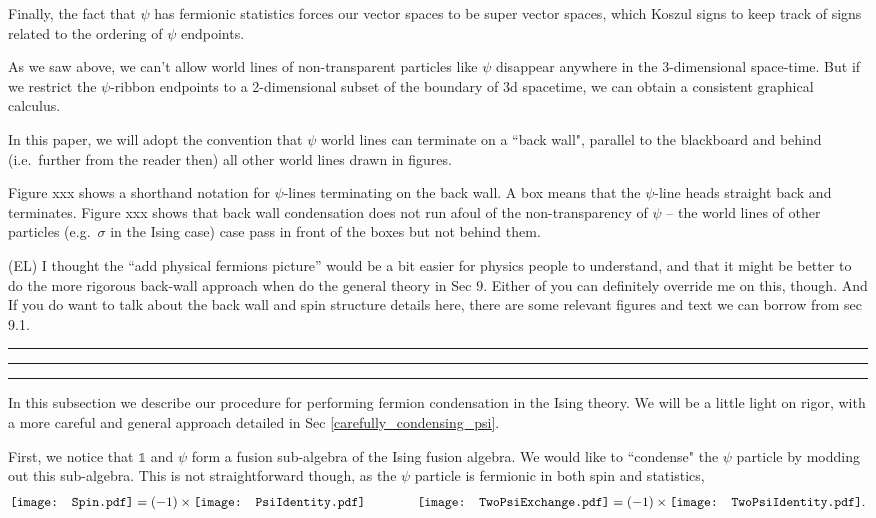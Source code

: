 \documentclass[12pt,a4paper]{article}
\newcommand{\unit}{\mathds{1}}
\newcommand{\dave}[1]{{\color{ao(english)}\footnotesize{(DA) #1}}}
\newcommand{\ethan}[1]{{\color{amethyst}\footnotesize{(EL) #1}}}
\newcommand{\kwsep}{\bigskip\hrule\medskip\hrule\medskip\hrule\bigskip}
\newcommand{\Spin}{\mathord{\vcenter{\hbox{\texttt{[image: Spin.pdf]}}}}}
\newcommand{\PsiIdentity}{\mathord{\vcenter{\hbox{\texttt{[image: PsiIdentity.pdf]}}}}}
\newcommand{\TwoPsiExchange}{\mathord{\vcenter{\hbox{\texttt{[image: TwoPsiExchange.pdf]}}}}}
\newcommand{\TwoPsiIdentity}{\mathord{\vcenter{\hbox{\texttt{[image: TwoPsiIdentity.pdf]}}}}}
\begin{document}
Finally, the fact that $\psi$ has fermionic statistics forces our vector spaces to be super vector spaces,
which Koszul signs to keep track of signs related to the ordering of $\psi$ endpoints.

\medskip

As we saw above, we can't allow world lines of non-transparent particles like $\psi$ disappear anywhere
in the 3-dimensional space-time.
But if we restrict the $\psi$-ribbon endpoints to a 2-dimensional subset of the boundary of 3d spacetime,
we can obtain a consistent graphical calculus.

In this paper, we will adopt the convention that $\psi$ world lines can terminate on a ``back wall", parallel to the 
blackboard and behind (i.e.\ further from the reader then) all other world lines drawn in figures.

Figure xxx shows a shorthand notation for $\psi$-lines terminating on the back wall.
A box means that the $\psi$-line heads straight back and terminates.
Figure xxx shows that back wall condensation does not run afoul of the non-transparency of $\psi$ --
the world lines of other particles (e.g.\ $\sigma$ in the Ising case) case pass in front of the boxes
but not behind them.

\ethan{I thought the ``add physical fermions picture'' would be a bit easier for physics people to understand, and that it might be better to do the more rigorous back-wall approach when do the general theory in Sec 9. 
Either of you can definitely override me on this, though. 
And If you do want to talk about the back wall and spin structure details here, there are some relevant figures and text we can borrow from sec 9.1.}

\medskip




\kwsep



In this subsection we describe our procedure for performing fermion condensation in the Ising theory. We will be a little light on rigor, with a more careful and general approach detailed in Sec \ref{carefully_condensing_psi}. 

First, we notice that $\unit$ and $\psi$ form a fusion sub-algebra of the Ising fusion algebra.
We would like to ``condense" the $\psi$ particle by modding out this sub-algebra.
This is not straightforward though, as the $\psi$ particle is fermionic in both spin and statistics,
\begin{align} \label{psi_a_fermion}
\Spin = (-1) \times  \PsiIdentity
\qquad \qquad \TwoPsiExchange =  (-1) \times\TwoPsiIdentity.
\end{align}
\end{document}
